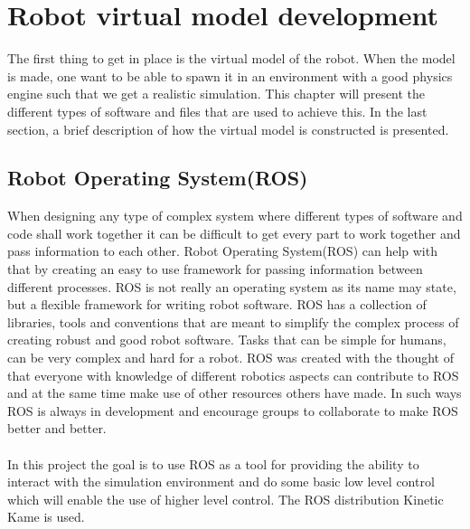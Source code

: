 \chapter{Robot virtual model development}\label{chap:soft}
The first thing to get in place is the virtual model of the robot. When the model is made, one want to be able to spawn it in an environment with a good physics engine such that we get a realistic simulation. This chapter will present the different types of software and files that are used to achieve this. In the last section, a brief description of how the virtual model is constructed is presented.   %




\section{Robot Operating System(ROS)}
When designing any type of complex system where different types of software and code shall work together it can be difficult to get every part to work together and pass information to each other. Robot Operating System(ROS) can help with that by creating an easy to use framework for passing information between different processes\cite{ROS}. ROS is not really an operating system as its name may state, but a flexible framework for writing robot software\cite{ROS}. ROS has a collection of libraries, tools and conventions that are meant to simplify the complex process of creating robust and good robot software. Tasks that can be simple for humans, can be very complex and hard for a robot. ROS was created with the thought of that everyone with knowledge of different robotics aspects can contribute to ROS and at the same time make use of other resources others have made. In such ways ROS is always in development and encourage groups to collaborate to make ROS better and better. \\\\
In this project the goal is to use ROS as a tool for providing the ability to interact with the simulation environment and do some basic low level control which will enable the use of higher level control. The ROS distribution Kinetic Kame is used\cite{ROS}.


